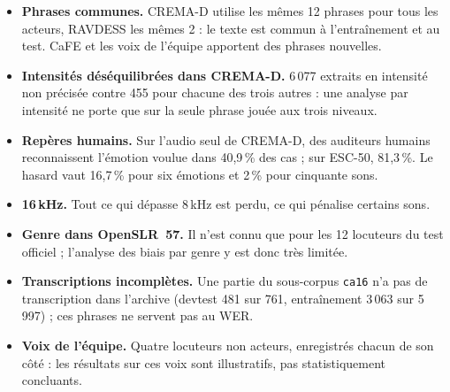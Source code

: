 \begin{itemize}
  \item \textbf{Phrases communes.} CREMA-D utilise les mêmes 12 phrases pour tous les acteurs,
        RAVDESS les mêmes 2 : le texte est commun à l'entraînement et au test. CaFE et les voix
        de l'équipe apportent des phrases nouvelles.
  \item \textbf{Intensités déséquilibrées dans CREMA-D.} 6\,077 extraits en intensité non
        précisée contre 455 pour chacune des trois autres : une analyse par intensité ne porte
        que sur la seule phrase jouée aux trois niveaux.
  \item \textbf{Repères humains.} Sur l'audio seul de CREMA-D, des auditeurs humains reconnaissent
        l'émotion voulue dans 40,9\,\% des cas ; sur ESC-50, 81,3\,\%. Le hasard vaut
        16,7\,\% pour six émotions et 2\,\% pour cinquante sons.
  \item \textbf{16\,kHz.} Tout ce qui dépasse 8\,kHz est perdu, ce qui pénalise certains sons.
  \item \textbf{Genre dans OpenSLR~57.} Il n'est connu que pour les 12 locuteurs du test
        officiel ; l'analyse des biais par genre y est donc très limitée.
  \item \textbf{Transcriptions incomplètes.} Une partie du sous-corpus \texttt{ca16} n'a pas de
        transcription dans l'archive (devtest 481 sur 761, entraînement 3\,063 sur 5\,997) ; ces
        phrases ne servent pas au WER.
  \item \textbf{Voix de l'équipe.} Quatre locuteurs non acteurs, enregistrés chacun de son
        côté : les résultats sur ces voix sont illustratifs, pas statistiquement concluants.
\end{itemize}
